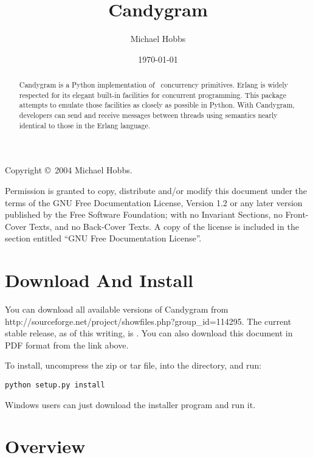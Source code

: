 \documentclass{howto}
\title{Candygram}
\date{\today}
\author{Michael Hobbs}
\newcommand{\Erlang}{\ulink{Erlang}{http://www.erlang.org/}}
\begin{document}
\maketitle

Copyright \copyright\ 2004 Michael Hobbs.

Permission is granted to copy, distribute and/or modify this document
under the terms of the GNU Free Documentation License, Version 1.2
or any later version published by the Free Software Foundation;
with no Invariant Sections, no Front-Cover Texts, and no Back-Cover Texts.
A copy of the license is included in the section entitled ``GNU
Free Documentation License''.

\begin{abstract}
\noindent
Candygram is a Python implementation of \Erlang\ concurrency primitives. Erlang
is widely respected for its elegant built-in facilities for concurrent
programming. This package attempts to emulate those facilities as closely as
possible in Python. With Candygram, developers can send and receive messages
between threads using semantics nearly identical to those in the Erlang
language.
\end{abstract}

\tableofcontents



\section{Download And Install}

You can download all available versions of Candygram from
	{http://sourceforge.net/project/showfiles.php?group_id=114295}. The current
stable release, as of this writing, is \version. You can also download this
document in PDF format from the link above.

To install, uncompress the zip or tar file,  into the directory, and
run:
\begin{verbatim}
python setup.py install
\end{verbatim}

Windows users can just download the installer program and run it.



\section{Overview}
\end{document}
